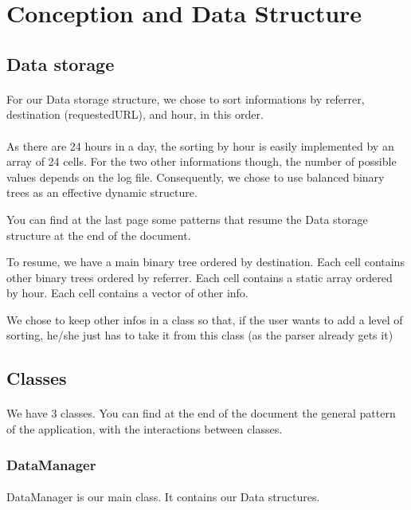 \documentclass[a4paper, 12pts]{article}
\begin{document}
 
\section{Conception and Data Structure}
\subsection{Data storage}
\paragraph{}
For our Data storage structure, we chose to sort informations by referrer, destination (requestedURL), and hour, in this order.
\paragraph{}
As there are 24 hours in a day, the sorting by hour is easily implemented by an array of 24 cells. For the two other informations though, the number of possible values depends on the log file. Consequently, we chose to use balanced binary trees as an effective dynamic structure.

You can find at the last page some patterns that resume the Data storage structure at the end of the document.

To resume, we have a main binary tree ordered by destination. Each cell contains other binary trees ordered by referrer. Each cell contains a static array ordered by hour. Each cell contains a vector of other info.

We chose to keep other infos in a class so that, if the user wants to add a level of sorting, he/she just has to take it from this class (as the parser already gets it)
\subsection{Classes}
\paragraph{}
We have 3 classes. You can find at the end of the document the general pattern of the application, with the interactions between classes.

\subsubsection{DataManager}
\paragraph{}
DataManager is our main class. It contains our Data structures.
\end{document}
